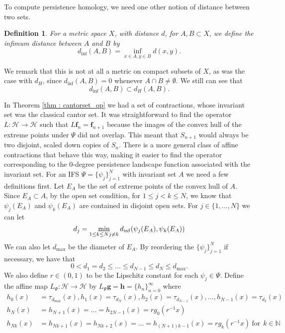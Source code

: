 \documentclass [52pt] {article}
\newcommand{\N}{\mathbb{N}}
\newcommand{\Hil}{\mathcal{H}}
\newtheorem{definition}{Definition}
\begin{document}
To compute persistence homology, we need one other notion of distance between two sets.
\begin{definition} For a metric space $X$, with distance $d$, for $A,B\subset X$, we define the infimum distance between $A$ and $B$ by
\[d_{\inf}(A,B) = \inf_{x\in A, y\in B}d(x,y).\]
\end{definition}
We remark that this is not at all a metric on compact subsets of $X$, as was the case with $d_H$, since $d_{\inf}(A,B) = 0$ whenever $A\cap B\not=\emptyset.$  We still can see that
\[d_{\inf}(A,B)\subset d_H(A,B).\]

In Theorem \ref{thm : cantorset_op} we had a set of contractions, whose invariant set was the classical cantor set.  It was straightforward to find the operator $L:\Hil\to\Hil$ such that $L\mathbf{f}_n = \mathbf{f}_{n+1}$ because the images of the convex hull of the extreme points under $\Psi$ did not overlap.  This meant that $S_{n+1}$ would always be two disjoint, scaled down copies of $S_n$.  There is a more general class of affine contractions that behave this way, making it easier to find the operator corresponding to the 0-degree persistence landscape function associated with the invariant set.  For an IFS $\Psi = \{\psi_{j}\}_{j=1}^N$ with invariant set $A$ we need a few definitions first.  Let $E_A$ be the set of extreme points of the convex hull of $A$.  Since $E_A\subset A$, by the open set condition, for $1\le j<k\le N$, we know that $\psi_j(E_A)$ and $\psi_k(E_A)$ are contained in disjoint open sets.  For $j\in \{1,...,N\}$ we can let
\[d_j = \min_{1\le k\le N\\ j\not= k}d_{\inf}(\psi_j(E_A),\psi_k(E_A))\]
We can also let $d_{\max}$ be the diameter of $E_A$.  By reordering the $\{\psi_j\}_{j=1}^N$ if necessary, we have that
\[0<d_1= d_2\le...\le d_{N-1}\le d_N\le d_{\max}.\]
We also define $r\in(0,1)$ to be the Lipschitz constant for each $\psi_j\in\Psi$.  Define the affine map $L_\Psi:\Hil \to\Hil$ by
$L_\Psi\mathbf{g} = \mathbf{h} = \{h_n\}_{n=0}^\infty$ where
\begin{equation}\label{eq : Lpsi_op}
\begin{split}
h_0(x) &= \tau_{d_{\max}}(x), h_1(x) = \tau_{d_N}(x), h_2(x) = \tau_{d_{N-1}}(x),...,h_{N-1}(x) = \tau_{d_2}(x)\\
h_N(x) &=h_{N+1}(x) = ... = h_{2N-1}(x) = rg_0(r^{-1}x)\\
h_{Nk}(x)&=h_{Nk +1}(x)= h_{Nk+2}(x) = ... =  h_{(N+1)k-1}(x) = rg_k(r^{-1}x)\:\text{for}\:\:k\in\N\\
\end{split}
\end{equation}
\end{document}

